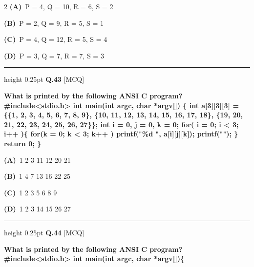 \documentclass[a4paper,10pt,twoside]{article}
\begin{document}
\begin{multicols}{2}
\textbf{(A)}~P = 4, Q = 10, R = 6, S = 2\par\vspace{2pt}\noindent
\textbf{(B)}~P = 2, Q = 9, R = 5, S = 1\par\vspace{2pt}\noindent
\textbf{(C)}~P = 4, Q = 12, R = 5, S = 4\par\vspace{2pt}\noindent
\textbf{(D)}~P = 3, Q = 7, R = 7, S = 3
\par\vspace{6pt}\hrule height 0.25pt\vspace{6pt}
\noindent\textbf{Q.43} \hfill {\footnotesize\textsf{[MCQ]}}
\par\vspace{2pt}
{\bfseries What is printed by the following ANSI C program?
\#include<stdio.h>
int main(int argc, char *argv[])
\{
int a[3][3][3] =
\{\{1, 2, 3, 4, 5, 6, 7, 8, 9\},
\{10, 11, 12, 13, 14, 15, 16, 17, 18\},
\{19, 20, 21, 22, 23, 24, 25, 26, 27\}\};
int i = 0, j = 0, k = 0;
for( i = 0; i < 3; i++ )\{
for(k = 0; k < 3; k++ )
printf("\%d ", a[i][j][k]);
printf("\n");
\}
return 0;
\} \par}
\par\vspace{2pt}\noindent
\textbf{(A)}~1 2 3  11 12  20 21\par\vspace{2pt}\noindent
\textbf{(B)}~1 4 7  13 16  22 25\par\vspace{2pt}\noindent
\textbf{(C)}~1 2 3  5 6  8 9\par\vspace{2pt}\noindent
\textbf{(D)}~1 2 3  14 15  26 27
\par\vspace{6pt}\hrule height 0.25pt\vspace{6pt}
\noindent\textbf{Q.44} \hfill {\footnotesize\textsf{[MCQ]}}
\par\vspace{2pt}
{\bfseries What is printed by the following ANSI C program?
\#include<stdio.h>
int main(int argc, char *argv[])\{
}
\end{multicols}
\end{document}
